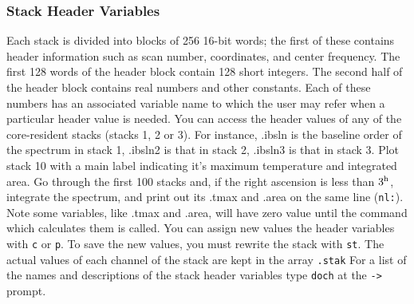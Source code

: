 \subsubsection{Stack Header Variables}
\label{sec-hvar}

Each stack is divided into blocks of 256 16-bit  words;  the
first of these contains header information such as scan number, coordinates, 
and center frequency.
The first 128 words of the header block contain 128 short integers.
The second half of the header block contains real numbers and other constants. 
Each of these numbers has an associated variable name to which the user
may refer when a particular header value is needed.  You can access
the header values of any of the core-resident stacks (\ie stacks 1, 2 or 3).
For instance, .ibsln is the baseline order of the spectrum in stack 1, .ibsln2
is that in stack 2, .ibsln3 is that in stack 3. 
\smallskip
{}
{Plot stack 10 with a main label indicating it's maximum temperature and
 integrated area.}
					{Go through the first 
                                        100 stacks and, if
					the right ascension is less than 
					$3^{\rm h}$, integrate the spectrum,
					and print out its .tmax and .area 
					on the same line ({\tt nl:}).}
\smallskip\noindent
Note some variables, like .tmax and .area, will have zero value until
the command which calculates them is called. 
You can assign new values the header variables with {\tt c} or {\tt p}. 
To save the new values, you must rewrite the stack with {\tt st}.
\smallskip
{}
\smallskip\noindent
The actual values of each channel of the stack are kept in the array {\tt .stak}
\smallskip
{}
\smallskip\noindent
For a list of the names and descriptions of the stack header variables type 
{\tt doch} at the {\tt ->} prompt. 

